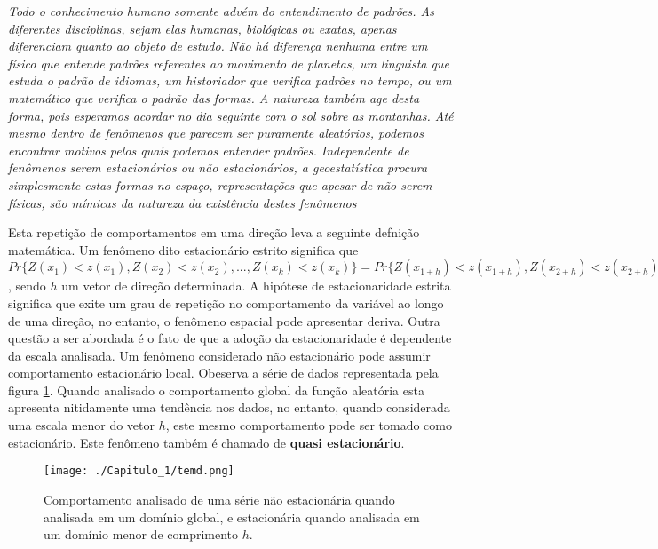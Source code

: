 \begin{proposition}
	\textit{Todo o conhecimento humano somente advém do entendimento de padrões. As diferentes disciplinas, sejam elas humanas, biológicas ou exatas, apenas diferenciam quanto ao objeto de estudo. Não há diferença nenhuma entre um físico que entende padrões referentes ao movimento de planetas, um linguista que estuda o padrão de idiomas, um historiador que verifica padrões no tempo, ou um matemático que verifica o padrão das formas. A natureza também age desta forma, pois esperamos acordar no dia seguinte com o sol sobre as montanhas. Até mesmo dentro de fenômenos que parecem ser puramente aleatórios, podemos encontrar motivos pelos quais podemos entender padrões. Independente de fenômenos serem estacionários ou não estacionários, a geoestatística procura simplesmente estas formas no espaço, representações que apesar de não serem físicas, são mímicas da natureza da existência destes fenômenos}
\end{proposition}
 
Esta repetição de comportamentos em uma direção leva a seguinte defnição matemática. Um fenômeno dito estacionário estrito significa que $Pr\{Z(x_{1}) < z(x_{1}), Z(x_{2}) < z(x_{2}),..., Z(x_{k}) < z(x_{k})\} = Pr\{Z(x_{1 + h}) < z(x_{1 + h}), Z(x_{2 + h}) < z(x_{2 + h}), ...,Z(x_{k + h}) < z(x_{k  + h})\}$, sendo $h$ um vetor de direção determinada. A hipótese de estacionaridade estrita significa que exite um grau de repetição no comportamento da variável ao longo de uma direção, no entanto, o fenômeno espacial pode apresentar deriva. Outra questão a ser abordada é o fato de que a adoção da estacionaridade é dependente da escala analisada. Um fenômeno considerado não estacionário pode assumir comportamento estacionário local. Obeserva a série de dados representada pela figura \ref{temd}. Quando analisado o comportamento global da função aleatória esta apresenta nitidamente uma tendência nos dados, no entanto, quando considerada uma escala menor do vetor $h$, este mesmo comportamento pode ser tomado como estacionário. Este fenômeno também é chamado de \textbf{quasi estacionário}.


\FloatBarrier
\begin{figure}[!htb]
	\centering
	\texttt{[image: ./Capitulo\_1/temd.png]}	
	\caption{Comportamento analisado de uma série não estacionária quando analisada em um domínio global, e estacionária quando analisada em um domínio menor de comprimento $h$. } 
	\label{temd}
\end{figure}
\FloatBarrier

